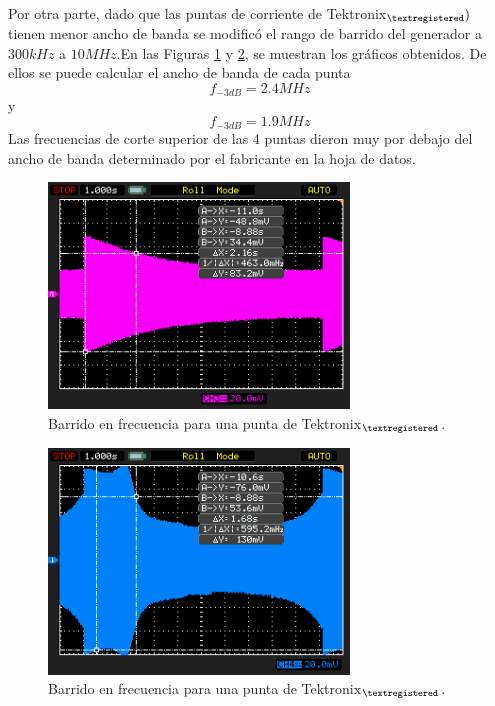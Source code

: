 \documentclass[a4paper,10pt]{article}
\begin{document}
		\indent Por otra parte, dado que las puntas de corriente de 
		Tektronix$_{\textregistered} )$ tienen menor ancho de banda se 
		modific\'o el rango de barrido del generador a $300kHz$ a $10MHz$.En 
		las Figuras \ref{img006} y \ref{img007}, se muestran los gr\'aficos 
		obtenidos. De ellos se puede calcular el ancho de banda de cada punta
		$$f_{-3dB}=2.4MHz$$ y $$f_{-3dB}=1.9MHz$$
		\indent Las frecuencias de corte superior de las 4 puntas dieron muy 
		por debajo del ancho de banda determinado por el fabricante en la hoja 
		de datos.
		
		\begin{figure}[!htb]
			\centering
			\includegraphics[width=8cm]
			{Imagenes/Mediciones instrumentos/NewFile7.png}
			\caption{Barrido en frecuencia para una punta de 
			Tektronix$_{\textregistered}$.} \label{img006}
		\end{figure}		
	
		\begin{figure}[!htb]
			\centering
			\includegraphics[width=8cm]
			{Imagenes/Mediciones instrumentos/NewFile8.png}
			\caption{Barrido en frecuencia para una punta de 
			Tektronix$_{\textregistered}$.} \label{img007}
		\end{figure}
	
\end{document}
